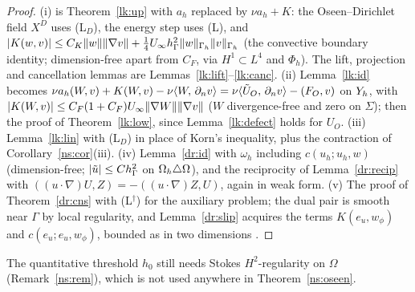 \begin{proof}
(i) is Theorem~\ref{lk:up} with $a_h$ replaced by $\nu a_h+K$: the Oseen--Dirichlet field $X^D$ uses (L$_D$), the energy step uses (L), and $|K(w,v)|\le C_K\lVert w\rVert\lVert \nabla v\rVert+\frac14U_\infty h_\Gamma^2\lVert w\rVert_{\Gamma_h}\lVert v\rVert_{\Gamma_h}$ (the convective boundary identity; dimension-free apart from $C_F$, via $H^1\subset L^4$ and $\Phi_h$). The lift, projection and cancellation lemmas are Lemmas~\ref{lk:lift}--\ref{lk:canc}. (ii) Lemma~\ref{lk:id} becomes $\nu a_h(W,v)+K(W,v)-\nu\langle W,\, \partial_n v\rangle=\nu\langle \tilde U_O,\, \partial_n v\rangle-(F_O,v)$ on $Y_h$, with $|K(W,v)|\le C_F(1+C_F)U_\infty\lVert \nabla W\rVert\lVert \nabla v\rVert$ ($W$ divergence-free and zero on $\Sigma$); then the proof of Theorem~\ref{lk:low}, since Lemma~\ref{lk:defect} holds for $U_O$. (iii) Lemma~\ref{lk:lin} with (L$_D$) in place of Korn's inequality, plus the contraction of Corollary~\ref{ns:cor}(iii). (iv) Lemma~\ref{dr:id} with $\omega_h$ including $c(u_h;u_h,w)$ (dimension-free; $|\tilde u|\le Ch_\Gamma^2$ on $\Omega_h\triangle\Omega$), and the reciprocity of Lemma~\ref{dr:recip} with $((u\cdot\nabla)U,Z)=-((u\cdot\nabla)Z,U)$, again in weak form. (v) The proof of Theorem~\ref{dr:cns} with (L$^\dagger$) for the auxiliary problem; the dual pair is smooth near $\Gamma$ by local regularity, and Lemma~\ref{dr:slip} acquires the terms $K(e_u,w_\phi)$ and $c(e_u;e_u,w_\phi)$, bounded as in two dimensions \cite{PadhiLong2D}.
\end{proof}
The quantitative threshold $h_0$ still needs Stokes $H^2$-regularity on $\Omega$ (Remark~\ref{ns:rem}), which is not used anywhere in Theorem~\ref{ns:oseen}.
